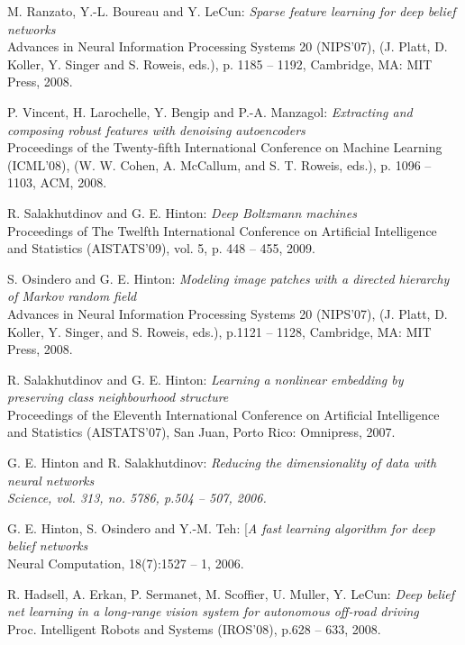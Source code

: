 \documentclass[a4paper,11pt]{report}
\begin{document}
\begin{thebibliography}{99}
	 M. Ranzato, Y.-L. Boureau and Y. LeCun: {\em Sparse feature learning for deep belief networks}\\
	Advances in Neural Information Processing Systems 20 (NIPS’07), (J. Platt, D. Koller, Y. Singer and S. Roweis, eds.), p. 1185 – 1192, Cambridge, MA: MIT Press, 2008.

	 P. Vincent, H. Larochelle, Y. Bengip and P.-A. Manzagol: {\em Extracting and composing robust features with denoising autoencoders}\\
	Proceedings of the Twenty-fifth International Conference on Machine Learning (ICML’08), (W. W. Cohen, A. McCallum, and S. T. Roweis, eds.), p. 1096 – 1103, ACM, 2008.
	
	 R. Salakhutdinov and G. E. Hinton: {\em Deep Boltzmann machines}\\
	Proceedings of The Twelfth International Conference on Artificial Intelligence and Statistics (AISTATS’09), vol. 5, p. 448 – 455, 2009.

	 S. Osindero and G. E. Hinton: {\em Modeling image patches with a directed hierarchy of Markov random field}\\
	Advances in Neural Information Processing Systems 20 (NIPS’07), (J. Platt, D. Koller, Y. Singer, and S. Roweis, eds.), p.1121 – 1128, Cambridge, MA: MIT Press, 2008.
	
	 R. Salakhutdinov and G. E. Hinton: {\em Learning a nonlinear embedding by preserving class neighbourhood structure}\\
	Proceedings of the Eleventh International Conference on Artificial Intelligence and Statistics (AISTATS’07), San Juan, Porto Rico: Omnipress, 2007.
	
	 G. E. Hinton and R. Salakhutdinov: \em{Reducing the dimensionality of data with neural networks}\\
	Science, vol. 313, no. 5786, p.504 – 507, 2006.
	
	 G. E. Hinton, S. Osindero and Y.-M. Teh: [{\em A fast learning algorithm for deep belief networks}\\
	Neural Computation, 18(7):1527 – 1, 2006.

	 R. Hadsell, A. Erkan, P. Sermanet, M. Scoffier, U. Muller, Y. LeCun: {\em Deep belief net learning in a long-range vision system for autonomous off-road driving}\\
	Proc. Intelligent Robots and Systems (IROS’08), p.628 – 633, 2008.
	

\end{thebibliography}
\end{document}
